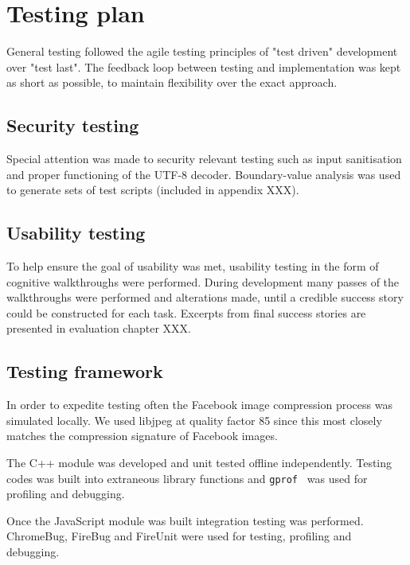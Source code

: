 \FloatBarrier
\section{Testing plan}

General testing followed the agile testing principles of "test driven" development over "test last". The feedback loop between testing and implementation was kept as short as possible, to maintain flexibility over the exact approach.


\subsection{Security testing}

Special attention was made to security relevant testing such as input sanitisation and proper functioning of the UTF-8 decoder. Boundary-value analysis was used to generate sets of test scripts (included in appendix XXX).


\subsection{Usability testing}

To help ensure the goal of usability was met, usability testing in the form of cognitive walkthroughs were performed. During development many passes of the walkthroughs were performed and alterations made, until a credible success story could be constructed for each task. Excerpts from final success stories are presented in evaluation chapter XXX.


\subsection{Testing framework}

In order to expedite testing often the Facebook image compression process was simulated locally. We used libjpeg at quality factor 85 since this most closely matches the compression signature of Facebook images.

The C++ module was developed and unit tested offline independently. Testing codes was built into extraneous library functions and {\tt gprof } was used for profiling and debugging.

Once the JavaScript module was built integration testing was performed. ChromeBug, FireBug and FireUnit were used for testing, profiling and debugging.

